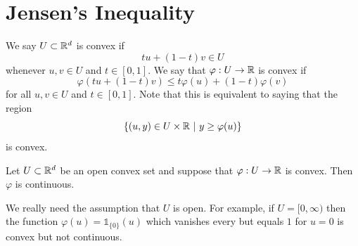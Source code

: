 \documentclass[twoside, a4paper, 10pt]{amsart}
\begin{document}
\section{Jensen's Inequality}

\begin{mydef} We say $U \subset \mathbb{R}^d$ is convex if $$tu + (1-t)v \in U$$ whenever $u,v \in U$ and $t \in [0,1]$. We say that $\varphi:U \to \mathbb{R}$ is convex if $$\varphi(tu + (1-t)v) \leq t \varphi(u) + (1-t)\varphi(v)$$ for all $u,v \in U$ and $t \in [0,1]$. Note that this is equivalent to saying that the region $$\{(u,y) \in U \times \mathbb{R} ~|~ y \geq \varphi(u) \}$$ is convex.

\end{mydef}

\begin{prop} Let $U \subset \mathbb{R}^d$ be an open convex set and suppose that $\varphi:U \to \mathbb{R}$ is convex. Then $\varphi$ is continuous.

\end{prop}

\begin{remark} We really need the assumption that $U$ is open. For example, if $U = [0,\infty)$ then the function $\varphi(u) = \mathds{1}_{\{0\}}(u)$ which vanishes every but equals $1$ for $u=0$ is convex but not continuous.

\end{remark}
\end{document}
